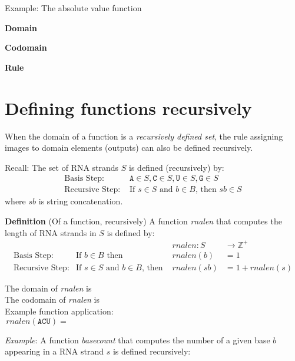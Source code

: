 \documentclass[12pt, oneside]{article}
\newcommand{\A}[0]{\texttt{A}}
\newcommand{\C}[0]{\texttt{C}}
\newcommand{\G}[0]{\texttt{G}}
\newcommand{\U}[0]{\texttt{U}}
\begin{document}
\vfill
\newpage

Example: The absolute value function 

{\bf Domain}

{\bf Codomain}

{\bf Rule}

\vfill 
 \vfill
\section*{Defining functions recursively}


When the domain of a function is a {\it recursively defined set}, the rule assigning 
images to domain elements (outputs) can also be defined recursively.

Recall: The set of RNA strands $S$ is defined (recursively) by:
\[
\begin{array}{ll}
\textrm{Basis Step: } & \A \in S, \C \in S, \U \in S, \G \in S \\
\textrm{Recursive Step: } & \textrm{If } s \in S\textrm{ and }b \in B \textrm{, then }sb \in S
\end{array}
\]
where $sb$ is string concatenation.

{\bf Definition} (Of a function, recursively) A function \textit{rnalen} that computes the length of RNA strands in $S$ is defined by:
\[
\begin{array}{llll}
& & \textit{rnalen} : S & \to \mathbb{Z}^+ \\
\textrm{Basis Step:} & \textrm{If } b \in B\textrm{ then } & \textit{rnalen}(b) & = 1 \\
\textrm{Recursive Step:} & \textrm{If } s \in S\textrm{ and }b \in B\textrm{, then  } & \textit{rnalen}(sb) & = 1 + \textit{rnalen}(s)
\end{array}
\]

The domain of \textit{rnalen} is \phantom{$S$}\\

The codomain of \textit{rnalen} is \\

Example function application:
\[
rnalen(\A\C\U) = \phantom{1+ rnalen(\A\C) = 1 + (1 + rnalen(\A) ) = 1 + ( 1 + 1) = 3}
\]

\vfill

{\it Example}: A function \textit{basecount} that computes the number of a given base 
$b$ appearing in a RNA strand $s$ is defined recursively:
    
\end{document}
